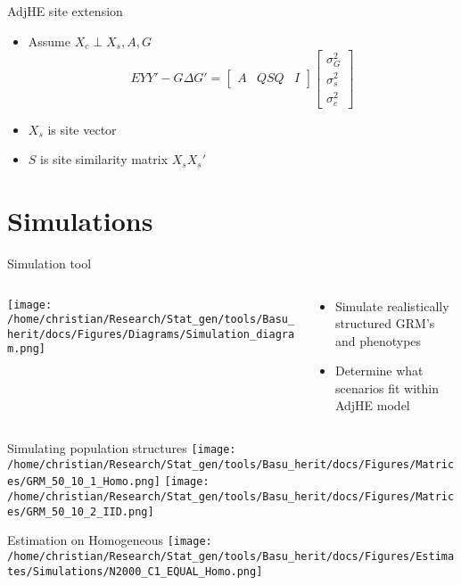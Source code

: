\documentclass[
  ignorenonframetext,
]{beamer}
\begin{document}
\begin{frame}{AdjHE site extension}
\begin{itemize}
	\item Assume $X_c \perp X_s, A, G$
	$$	EYY' - G\Delta G' = 
	\begin{bmatrix}
	A & QSQ & I
	\end{bmatrix}\begin{bmatrix}
	\sigma_G^2 \\ \sigma_s^2 \\ \sigma_e^2
	\end{bmatrix}$$
	\item $X_s$ is site vector
	\item $S$ is site similarity matrix $X_sX_s'$
	\end{itemize}
\end{frame}


\section{Simulations}
\begin{frame}{Simulation tool}
\begin{columns}
\begin{column}{0.7\textwidth}
\texttt{[image: /home/christian/Research/Stat\_gen/tools/Basu\_herit/docs/Figures/Diagrams/Simulation\_diagram.png]}
\end{column}
\begin{column}{0.3\textwidth}
\begin{itemize}
	\item Simulate realistically structured GRM's and phenotypes
	\item Determine what scenarios fit within AdjHE model
\end{itemize}
\end{column}
\end{columns}
\end{frame}


\begin{frame}{Simulating population structures}
\texttt{[image: /home/christian/Research/Stat\_gen/tools/Basu\_herit/docs/Figures/Matrices/GRM\_50\_10\_1\_Homo.png]}
\texttt{[image: /home/christian/Research/Stat\_gen/tools/Basu\_herit/docs/Figures/Matrices/GRM\_50\_10\_2\_IID.png]}
\end{frame}


\begin{frame}{Estimation on Homogeneous}
\centering
 \texttt{[image: /home/christian/Research/Stat\_gen/tools/Basu\_herit/docs/Figures/Estimates/Simulations/N2000\_C1\_EQUAL\_Homo.png]}
\end{frame}
\end{document}
